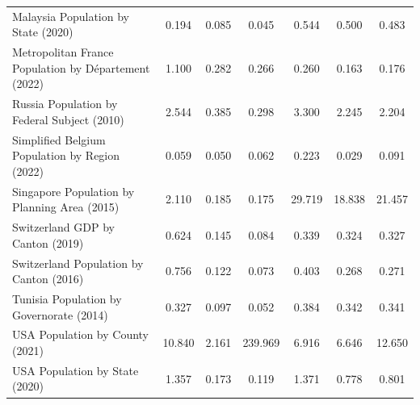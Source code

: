 \begin{tabular}{lccc|ccc}
                      Malaysia Population by State (2020) &         0.194 &         0.085 &            0.045 &                                    0.544 &                                    0.500 &                                       0.483 \\
     Metropolitan France Population by Département (2022) &         1.100 &         0.282 &            0.266 &                                    0.260 &                                    0.163 &                                       0.176 \\
              Russia Population by Federal Subject (2010) &         2.544 &         0.385 &            0.298 &                                    3.300 &                                    2.245 &                                       2.204 \\
           Simplified Belgium Population by Region (2022) &         0.059 &         0.050 &            0.062 &                                    0.223 &                                    0.029 &                                       0.091 \\
             Singapore Population by Planning Area (2015) &         2.110 &         0.185 &            0.175 &                                   29.719 &                                   18.838 &                                      21.457 \\
                         Switzerland GDP by Canton (2019) &         0.624 &         0.145 &            0.084 &                                    0.339 &                                    0.324 &                                       0.327 \\
                  Switzerland Population by Canton (2016) &         0.756 &         0.122 &            0.073 &                                    0.403 &                                    0.268 &                                       0.271 \\
                 Tunisia Population by Governorate (2014) &         0.327 &         0.097 &            0.052 &                                    0.384 &                                    0.342 &                                       0.341 \\
                          USA Population by County (2021) &        10.840 &         2.161 &          239.969 &                                    6.916 &                                    6.646 &                                      12.650 \\
                           USA Population by State (2020) &         1.357 &         0.173 &            0.119 &                                    1.371 &                                    0.778 &                                       0.801 \\

\end{tabular}
